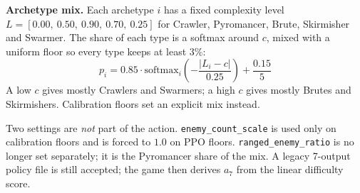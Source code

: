 \textbf{Archetype mix.} Each archetype $i$ has a fixed complexity level $L = [0.00,\allowbreak\ 0.50,\allowbreak\ 0.90,\allowbreak\ 0.70,\allowbreak\ 0.25]$ for Crawler, Pyromancer, Brute, Skirmisher and Swarmer. The share of each type is a softmax around $c$, mixed with a uniform floor so every type keeps at least $3\%$:
\begin{equation}
p_i = 0.85 \cdot \text{softmax}_i\!\left(-\frac{|L_i - c|}{0.25}\right) + \frac{0.15}{5}
\label{eq:mix}
\end{equation}
A low $c$ gives mostly Crawlers and Swarmers; a high $c$ gives mostly Brutes and Skirmishers. Calibration floors set an explicit mix instead.

Two settings are \emph{not} part of the action. \texttt{enemy\_count\_scale} is used only on calibration floors and is forced to $1.0$ on PPO floors. \texttt{ranged\_enemy\_ratio} is no longer set separately; it is the Pyromancer share of the mix. A legacy 7-output policy file is still accepted; the game then derives $a_7$ from the linear difficulty score.

